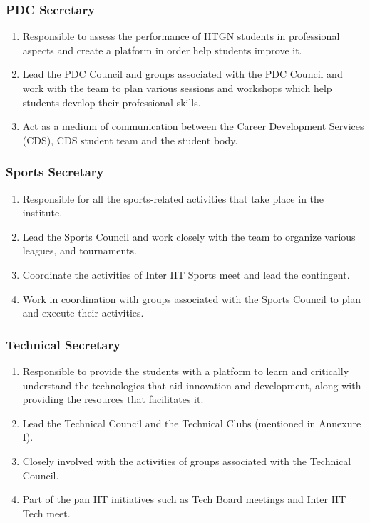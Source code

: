 \documentclass[12pt]{article}
\begin{document}
\subsubsection*{PDC Secretary}
\begin{enumerate}
    \item  Responsible to assess the performance of IITGN students in professional aspects and create a platform in order help students improve it.
    \item Lead the PDC Council and groups associated with the PDC Council and work with the team to plan various sessions and workshops which help students develop their professional skills.
    \item  Act as a medium of communication between the Career Development Services (CDS), CDS student team and the student body.
\end{enumerate}

\subsubsection*{Sports Secretary}
\begin{enumerate}
    \item Responsible for all the sports-related activities that take place in the institute.
    \item Lead the Sports Council and work closely with the team to organize various leagues, and tournaments.
    \item Coordinate the activities of Inter IIT Sports meet and lead the contingent.
    \item Work in coordination with groups associated with the Sports Council to plan and execute their activities.
\end{enumerate}

\subsubsection*{Technical Secretary}
\begin{enumerate}
    \item Responsible to provide the students with a platform to learn and critically understand the technologies that aid innovation and development, along with providing the resources that facilitates it.
    \item Lead the Technical Council and the Technical Clubs (mentioned in Annexure I).
    \item Closely involved with the activities of groups associated with the Technical Council.
    \item Part of the pan IIT initiatives such as Tech Board meetings and Inter IIT Tech meet.
\end{enumerate}
\end{document}
